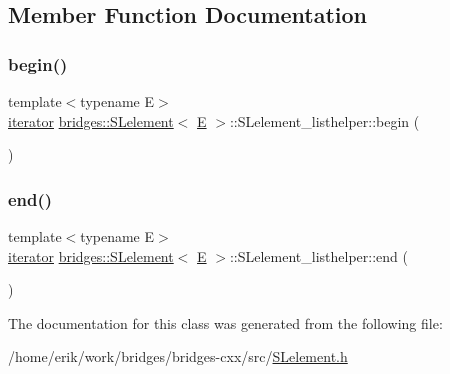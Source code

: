 \subsection{Member Function Documentation}
\mbox{\label{classbridges_1_1_s_lelement_1_1_s_lelement__listhelper_a62443bbcdabeba6dc3a784f84375bc32}} 
\subsubsection{\texorpdfstring{begin()}{begin()}}
{\footnotesize\ttfamily template$<$typename E$>$ \\
\hyperlink{classbridges_1_1_s_lelement_1_1_s_lelement__listhelper_1_1iterator}{iterator} \hyperlink{classbridges_1_1_s_lelement}{bridges\+::\+S\+Lelement}$<$ \hyperlink{namespacebridges_acfb0a4f7877d8f63de3e6862004c50eda3a3ea00cfc35332cedf6e5e9a32e94da}{E} $>$\+::S\+Lelement\+\_\+listhelper\+::begin (\begin{DoxyParamCaption}{ }\end{DoxyParamCaption})\hspace{0.3cm}{\ttfamily [inline]}}

\mbox{\label{classbridges_1_1_s_lelement_1_1_s_lelement__listhelper_ac3adfea9337ba2f237a667794e41a975}} 
\subsubsection{\texorpdfstring{end()}{end()}}
{\footnotesize\ttfamily template$<$typename E$>$ \\
\hyperlink{classbridges_1_1_s_lelement_1_1_s_lelement__listhelper_1_1iterator}{iterator} \hyperlink{classbridges_1_1_s_lelement}{bridges\+::\+S\+Lelement}$<$ \hyperlink{namespacebridges_acfb0a4f7877d8f63de3e6862004c50eda3a3ea00cfc35332cedf6e5e9a32e94da}{E} $>$\+::S\+Lelement\+\_\+listhelper\+::end (\begin{DoxyParamCaption}{ }\end{DoxyParamCaption})\hspace{0.3cm}{\ttfamily [inline]}}



The documentation for this class was generated from the following file\+:\begin{DoxyCompactItemize}
\item 
/home/erik/work/bridges/bridges-\/cxx/src/\hyperlink{_s_lelement_8h}{S\+Lelement.\+h}\end{DoxyCompactItemize}
